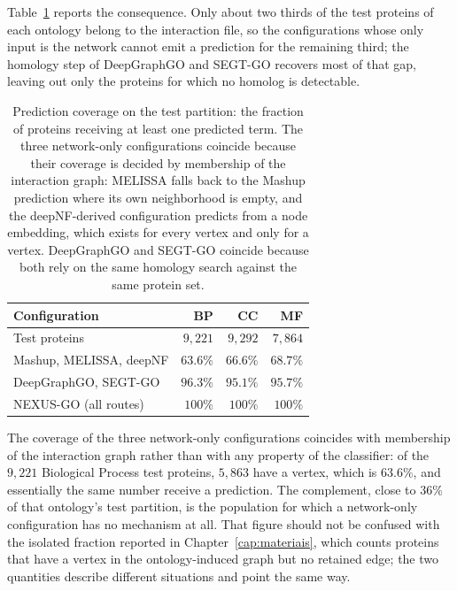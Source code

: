 \documentclass[Ingles]{ic-tese-v3}
\begin{document}
\begin{appendices}{}
Table~\ref{tab:ape_cobertura} reports the consequence. Only about two thirds of the test proteins of
each ontology belong to the interaction file, so the configurations whose only input is the network
cannot emit a prediction for the remaining third; the homology step of DeepGraphGO and SEGT-GO
recovers most of that gap, leaving out only the proteins for which no homolog is detectable.

\begin{table}[!htb]
  \centering
  \small
  \caption{Prediction coverage on the test partition: the fraction of proteins receiving at least one
  predicted term. The three network-only configurations coincide because their coverage is decided by
  membership of the interaction graph: MELISSA falls back to the Mashup prediction where its own
  neighborhood is empty, and the deepNF-derived configuration predicts from a node embedding, which
  exists for every vertex and only for a vertex. DeepGraphGO and SEGT-GO coincide because both rely
  on the same homology search against the same protein set.}
  \label{tab:ape_cobertura}
  \begin{tabular}{lrrr}
    \hline
    \textbf{Configuration} & \textbf{BP} & \textbf{CC} & \textbf{MF} \\
    \hline
    Test proteins                                & $9{,}221$ & $9{,}292$ & $7{,}864$ \\
    \hline
    Mashup, MELISSA, deepNF                      & $63.6\%$ & $66.6\%$ & $68.7\%$ \\
    DeepGraphGO, SEGT-GO                         & $96.3\%$ & $95.1\%$ & $95.7\%$ \\
    NEXUS-GO (all routes)                        & $100\%$  & $100\%$  & $100\%$ \\
    \hline
  \end{tabular}
\end{table}

The coverage of the three network-only configurations coincides with membership of the interaction
graph rather than with any property of the classifier: of the $9{,}221$ Biological Process test
proteins,
$5{,}863$ have a vertex, which is $63.6\%$, and essentially the same number receive a prediction.
The complement, close to $36\%$ of that ontology's test partition, is the population for which a
network-only configuration has no mechanism at all. That figure should not be confused with the
isolated fraction reported in Chapter~\ref{cap:materiais}, which counts proteins that have a vertex
in the ontology-induced graph but no retained edge; the two quantities describe different situations
and point the same way.


\end{appendices}
\end{document}
